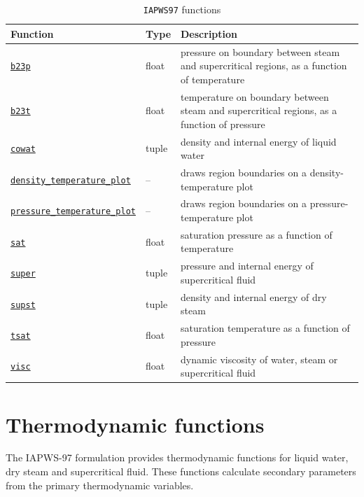 \begin{table}
  \begin{center}
    \begin{tabular}{|l|l|p{65mm}|}
      \hline
      \textbf{Function} & \textbf{Type} & \textbf{Description}\\
      \hline
      \hyperref[sec:iapws97:b23p]{\texttt{b23p}} & float & pressure on boundary between steam and supercritical regions, as a function of temperature\\
      \hyperref[sec:iapws97:b23t]{\texttt{b23t}} & float & temperature on boundary between steam and supercritical regions, as a function of pressure\\
      \hyperref[sec:iapws97:cowat]{\texttt{cowat}} & tuple & density and internal energy of liquid water\\
      \hyperref[sec:iapws97:density_temperature_plot]{\texttt{density\_temperature\_plot}} & -- & draws region boundaries on a density-temperature plot\\
      \hyperref[sec:iapws97:pressure_temperature_plot]{\texttt{pressure\_temperature\_plot}} & -- & draws region boundaries on a pressure-temperature plot\\
      \hyperref[sec:iapws97:sat]{\texttt{sat}} & float & saturation pressure as a function of temperature\\
      \hyperref[sec:iapws97:super]{\texttt{super}} & tuple & pressure and internal energy of supercritical fluid\\
      \hyperref[sec:iapws97:supst]{\texttt{supst}} & tuple & density and internal energy of dry steam\\
      \hyperref[sec:iapws97:tsat]{\texttt{tsat}} & float & saturation temperature as a function of pressure\\
      \hyperref[sec:iapws97:visc]{\texttt{visc}} & float & dynamic viscosity of water, steam or supercritical fluid\\
      \hline
    \end{tabular}
    \caption{\texttt{IAPWS97} functions}
    \label{tb:iapws97_functions}
  \end{center}
\end{table}

\section{Thermodynamic functions}

The IAPWS-97 formulation provides thermodynamic functions for liquid water, dry steam and supercritical fluid.  These functions calculate secondary parameters from the primary thermodynamic variables.

